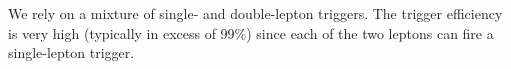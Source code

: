 
We rely on a
mixture of single- and double-lepton triggers.  The trigger
efficiency is very high (typically in excess of 99\%) since
each of the two leptons can fire a single-lepton trigger.

%
